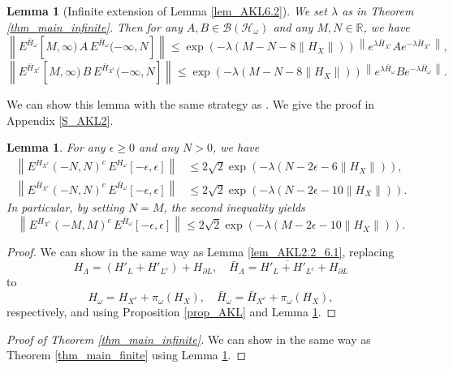 \documentclass[11pt]{article}
\numberwithin{equation}{section}
\newtheorem{lemma}[theorem]{Lemma}
\begin{document}
\begin{lemma}[Infinite extension of Lemma \ref{lem_AKL6.2}]\label{lem_AKL2}
We set $\lambda$ as in Theorem \ref{thm_main_infinite}. Then for any $A,B\in\mathcal{B}(\mathcal{H}_\omega)$ and any $M,N\in\mathbb{R}$, we have
\[
\left\|E^{\bar{H}_\omega}[M,\infty) \,A\, E^{\bar{H}_\omega}(-\infty,N]\right\|
\leq \exp(-\lambda(M-N-8\|H_X\|)) \left\|e^{\lambda\bar{H}_{X^c}}Ae^{-\lambda\bar{H}_{X^c}}\right\|,
\]
\[
\left\|E^{\bar{H}_{X^c}}[M,\infty) \,B\, E^{\bar{H}_{X^c}}(-\infty,N]\right\|
\leq \exp\left(-\lambda(M-N-8\|H_X\|)\right)\left\| e^{\lambda\bar{H}_\omega}Be^{-\lambda\bar{H}_\omega}\right\|.
\]
\end{lemma}

We can show this lemma with the same strategy as \cite[Lemma 6.2]{Arad-Kuwahara-Landau 2016}. We give the proof in Appendix \ref{S_AKL2}.

\begin{lemma}\label{lem_AKL3}
For any $\epsilon\geq0$ and any $N>0$, we have
\begin{align*}
\left\|E^{H_{X^c}}(-N,N)^c\,
E^{H_\omega}[-\epsilon,\epsilon]\right\|
&\leq 2\sqrt{2} \exp(-\lambda(N-2\epsilon-6\|H_X\|)),\\
\left\|E^{\bar{H}_{X^c}}(-N,N)^c\,
E^{\bar{H}_\omega}[-\epsilon,\epsilon]\right\|
&\leq 2\sqrt{2} \exp(-\lambda(N-2\epsilon-10\|H_X\|)).
\end{align*}
In particular, by setting $N=M$, the second inequality yields
\[
\left\|E^{H_{X^c}}(-M,M)^c\,
E^{\bar{H}_\omega}[-\epsilon,\epsilon]\right\|
\leq 2\sqrt{2} \exp(-\lambda(M-2\epsilon-10\|H_X\|)).
\]
\end{lemma}

\begin{proof}
We can show in the same way as Lemma \ref{lem_AKL2.2_6.1}, replacing
\[
H_\Lambda=(H'_L+H'_{L^c})+H_{\partial L},\quad
\bar{H}_\Lambda=\overline{H'_L+H'_{L^c}}+H_{\partial L}
\]
to
\[
H_\omega=H_{X^c}+\pi_\omega(H_X),\quad
\bar{H}_\omega=\bar{H}_{X^c}+\pi_\omega(H_X), 
\]
respectively, and using Proposition \ref{prop_AKL} and Lemma \ref{lem_AKL2}.
\end{proof}

\begin{proof}[Proof of Theorem \ref{thm_main_infinite}]
We can show in the same way as Theorem \ref{thm_main_finite} using Lemma \ref{lem_AKL3}.
\end{proof}
\end{document}
